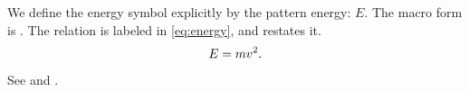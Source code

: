 \documentclass[main.tex]{subfiles}
\begin{document}
We define the energy symbol explicitly by the pattern energy: $E$. The macro form is \EnergySymbol.
The relation is labeled in \cref{eq:energy}, and  restates it.
\begin{equation}\label{eq:energy}
  E=mv^2.
\end{equation}
See \parencite{OnlineSource} and \textcite{DataSet}.
\end{document}
